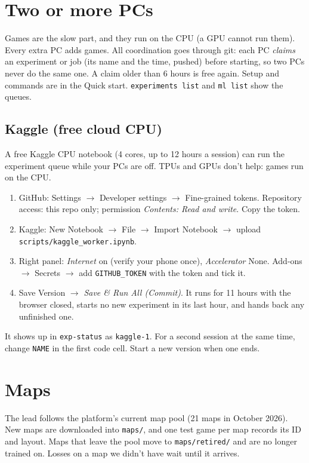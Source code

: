 \documentclass[11pt,a4paper]{article}
\newcommand{\f}[1]{\texttt{#1}}
\begin{document}
\section{Two or more PCs}\label{sec:pcs}
Games are the slow part, and they run on the CPU (a GPU cannot run them). Every extra PC adds games.
All coordination goes through git: each PC \emph{claims} an experiment or job (its name and the time,
pushed) before starting, so two PCs never do the same one. A claim older than 6 hours is free again.
Setup and commands are in the Quick start. \f{experiments list} and \f{ml list} show the queues.

\subsection*{Kaggle (free cloud CPU)}
A free Kaggle CPU notebook (4 cores, up to 12 hours a session) can run the experiment queue while
your PCs are off. TPUs and GPUs don't help: games run on the CPU.
\begin{enumerate}[nosep]
\item GitHub: Settings $\to$ Developer settings $\to$ Fine-grained tokens. Repository access: this
  repo only; permission \emph{Contents: Read and write}. Copy the token.
\item Kaggle: New Notebook $\to$ File $\to$ Import Notebook $\to$ upload
  \f{scripts/kaggle\_worker.ipynb}.
\item Right panel: \emph{Internet} on (verify your phone once), \emph{Accelerator} None.
  Add-ons $\to$ Secrets $\to$ add \f{GITHUB\_TOKEN} with the token and tick it.
\item Save Version $\to$ \emph{Save \& Run All (Commit)}. It runs for 11 hours with the browser
  closed, starts no new experiment in its last hour, and hands back any unfinished one.
\end{enumerate}
It shows up in \f{exp-status} as \f{kaggle-1}. For a second session at the same time, change
\f{NAME} in the first code cell. Start a new version when one ends.

\section{Maps}
The lead follows the platform's current map pool (21 maps in October 2026). New maps are downloaded
into \f{maps/}, and one test game per map records its ID and layout. Maps that leave the pool move to
\f{maps/retired/} and are no longer trained on. Losses on a map we didn't have wait until it arrives.
\end{document}
